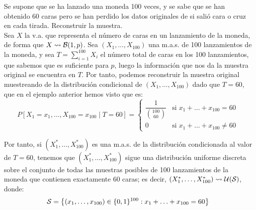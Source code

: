 \begin{ejemplo}
    Se supone que se ha lanzado una moneda 100 veces, y se sabe que se han obtenido 60 caras pero se han perdido los datos originales de si salió cara o cruz en cada tirada. Reconstruir la muestra.\\

    Sea $X$ la v.a. que representa el número de caras en un lanzamiento de la moneda, de forma que $X\rightsquigarrow \mathcal{B}(1,p)$. Sea $(X_1, \ldots, X_{100})$ una m.a.s. de 100 lanzamientos de la moneda, y sea $T = \sum\limits_{i=1}^{100} X_i$ el número total de caras en los 100 lanzamientos, que sabemos que es suficiente para $p$, luego la información que nos da la muestra original se encuentra en $T$. Por tanto, podemos reconstruir la muestra original muestreando de la distribución condicional de $(X_1, \ldots, X_{100})$ dado que $T=60$, que en el ejemplo anterior hemos visto que es:
    \begin{equation*}
        P[X_1=x_1, \ldots, X_{100}=x_{100} \mid T=60] = \begin{cases}
            \dfrac{1}{\binom{100}{60}} & \text{si } x_1+\ldots+x_{100}=60 \\
            0 & \text{si } x_1+\ldots+x_{100}\neq 60
        \end{cases}
    \end{equation*}

    Por tanto, si $(X_1^*, \ldots, X_{100}^*)$ es una m.a.s. de la distribución condicionada al valor de $T=60$, tenemos que $(X_1^*, \ldots, X_{100}^*)$ sigue una distribución uniforme discreta sobre el conjunto de todas las muestras posibles de 100 lanzamientos de la moneda que contienen exactamente 60 caras; es decir, $(X_1^*, \ldots, X_{100}^*)\rightsquigarrow \mathcal{U}(\mathcal{S})$, donde:
    \begin{equation*}
        \mathcal{S} = \left\{(x_1, \ldots, x_{100})\in\{0,1\}^{100} : x_1+\ldots+x_{100}=60\right\}
    \end{equation*}
\end{ejemplo}


